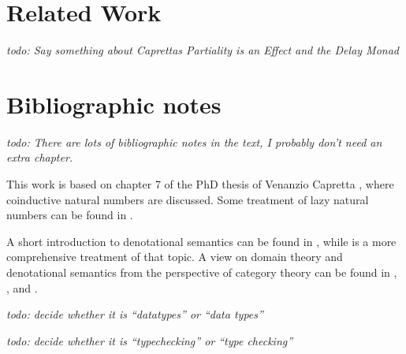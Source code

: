 \documentclass[a4paper]{article}
\newcommand{\todo}[1]{\smallskip \noindent \emph{todo: #1} \smallskip}
\begin{document}

\section{Related Work}

\todo{Say something about \emph{Caprettas Partiality is an Effect} and the Delay Monad}

\section{Bibliographic notes}

\todo{There are lots of bibliographic notes in the text, I probably don't need an
extra chapter.}

This work is based on chapter 7 of the PhD thesis of Venanzio Capretta
\cite{Capretta2002}, where coinductive natural numbers are discussed.  Some
treatment of lazy natural numbers can be found in \cite{Escardo1993}.

A short introduction to denotational semantics can be found in
\cite{Allison1986}, while \cite{Gunter1992} is a more comprehensive treatment of
that topic.  A view on domain theory and denotational semantics from the
perspective of category theory can be found in \cite{Pierce1991},
\cite{Bird1997}, \cite{Mitchell1996} and \cite{BarrWells1990}.





\todo{decide whether it is ``datatypes'' or ``data types''}

\todo{decide whether it is ``typechecking'' or ``type checking''}
\end{document}
